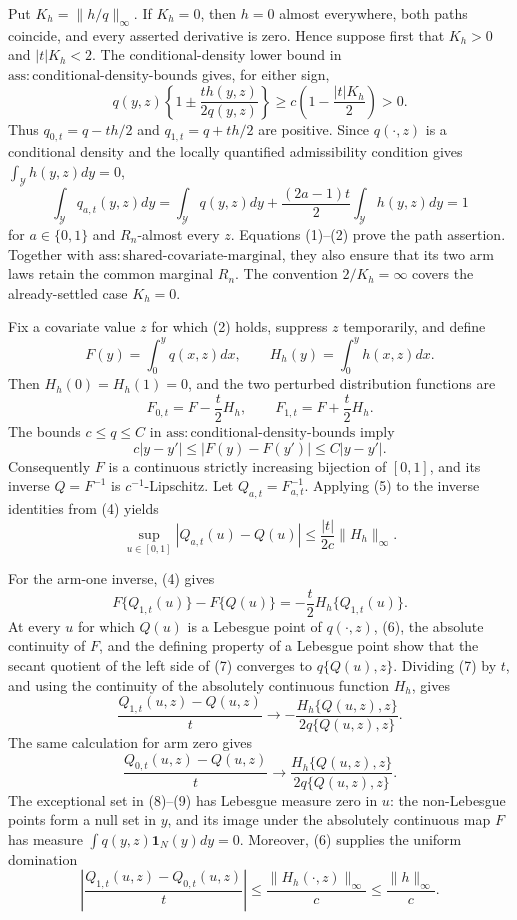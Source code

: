 Put \(K_h=\|h/q\|_{\infty}\).  If \(K_h=0\), then \(h=0\) almost everywhere, both paths coincide, and every asserted derivative is zero.  Hence suppose first that \(K_h>0\) and \(|t|K_h<2\).  The conditional-density lower bound in \(\mathrm{ass{:}conditional\text{-}density\text{-}bounds}\) gives, for either sign,
\[
q(y,z)\left\{1\pm\frac{t h(y,z)}{2q(y,z)}\right\}
\ge c\left(1-\frac{|t|K_h}{2}\right)>0.
\tag{1}
\]
Thus \(q_{0,t}=q-th/2\) and \(q_{1,t}=q+th/2\) are positive.  Since \(q(\cdot,z)\) is a conditional density and the locally quantified admissibility condition gives \(\int_{\mathcal Y}h(y,z)dy=0\),
\[
\int_{\mathcal Y}q_{a,t}(y,z)dy
=\int_{\mathcal Y}q(y,z)dy+\frac{(2a-1)t}{2}
  \int_{\mathcal Y}h(y,z)dy
=1
\tag{2}
\]
for \(a\in\{0,1\}\) and \(R_n\)-almost every \(z\).  Equations (1)--(2) prove the path assertion.  Together with \(\mathrm{ass{:}shared\text{-}covariate\text{-}marginal}\), they also ensure that its two arm laws retain the common marginal \(R_n\).  The convention \(2/K_h=\infty\) covers the already-settled case \(K_h=0\).

Fix a covariate value \(z\) for which (2) holds, suppress \(z\) temporarily, and define
\[
F(y)=\int_0^yq(x,z)dx,
\qquad
H_h(y)=\int_0^yh(x,z)dx.
\tag{3}
\]
Then \(H_h(0)=H_h(1)=0\), and the two perturbed distribution functions are
\[
F_{0,t}=F-\frac{t}{2}H_h,
\qquad
F_{1,t}=F+\frac{t}{2}H_h.
\tag{4}
\]
The bounds \(c\le q\le C\) in \(\mathrm{ass{:}conditional\text{-}density\text{-}bounds}\) imply
\[
c|y-y'|\le |F(y)-F(y')|\le C|y-y'|.
\tag{5}
\]
Consequently \(F\) is a continuous strictly increasing bijection of \([0,1]\), and its inverse \(Q=F^{-1}\) is \(c^{-1}\)-Lipschitz.  Let \(Q_{a,t}=F_{a,t}^{-1}\).  Applying (5) to the inverse identities from (4) yields
\[
\sup_{u\in[0,1]}|Q_{a,t}(u)-Q(u)|
\le \frac{|t|}{2c}\|H_h\|_{\infty}.
\tag{6}
\]

For the arm-one inverse, (4) gives
\[
F\{Q_{1,t}(u)\}-F\{Q(u)\}
=-\frac{t}{2}H_h\{Q_{1,t}(u)\}.
\tag{7}
\]
At every \(u\) for which \(Q(u)\) is a Lebesgue point of \(q(\cdot,z)\), (6), the absolute continuity of \(F\), and the defining property of a Lebesgue point show that the secant quotient of the left side of (7) converges to \(q\{Q(u),z\}\).  Dividing (7) by \(t\), and using the continuity of the absolutely continuous function \(H_h\), gives
\[
\frac{Q_{1,t}(u,z)-Q(u,z)}{t}
\longrightarrow
-\frac{H_h\{Q(u,z),z\}}{2q\{Q(u,z),z\}}.
\tag{8}
\]
The same calculation for arm zero gives
\[
\frac{Q_{0,t}(u,z)-Q(u,z)}{t}
\longrightarrow
\frac{H_h\{Q(u,z),z\}}{2q\{Q(u,z),z\}}.
\tag{9}
\]
The exceptional set in (8)--(9) has Lebesgue measure zero in \(u\): the non-Lebesgue points form a null set in \(y\), and its image under the absolutely continuous map \(F\) has measure \(\int q(y,z)\mathbf 1_N(y)dy=0\).  Moreover, (6) supplies the uniform domination
\[
\left|\frac{Q_{1,t}(u,z)-Q_{0,t}(u,z)}{t}\right|
\le \frac{\|H_h(\cdot,z)\|_{\infty}}{c}
\le \frac{\|h\|_{\infty}}{c}.
\tag{10}
\]

